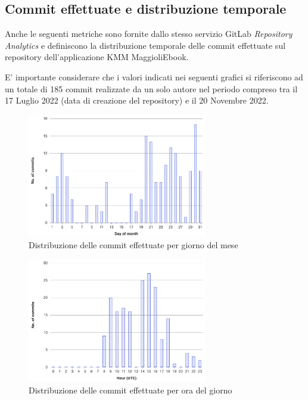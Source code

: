 \subsection*{Commit effettuate e distribuzione temporale}
Anche le seguenti metriche sono fornite dallo stesso servizio GitLab \textit{Repository Analytics} e definiscono la distribuzione temporale delle commit effettuate sul repository dell'applicazione KMM MaggioliEbook.

E' importante considerare che i valori indicati nei seguenti grafici si riferiscono ad un totale di 185 commit realizzate da un solo autore nel periodo compreso tra il 17 Luglio 2022 (data di creazione del repository) e il 20 Novembre 2022.

\begin{figure}[H]
\centering
    \includegraphics[width=0.7\textwidth]{img/commit-per-day-of-month.png}
    \caption{Distribuzione delle commit effettuate per giorno del mese}
    \label{commit-per-day-of-month}
\end{figure}

\begin{figure}[H]
\centering
    \includegraphics[width=0.7\textwidth]{img/commit-per-day-hour.png}
    \caption{Distribuzione delle commit effettuate per ora del giorno}
    \label{commit-per-day-hour}
\end{figure}

